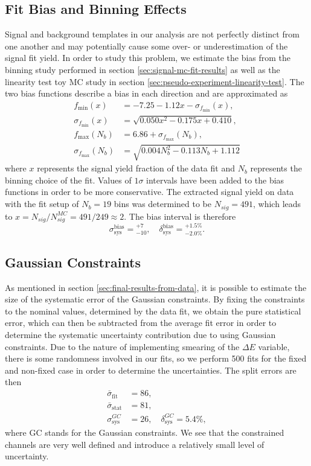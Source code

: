\subsection{Fit Bias and Binning Effects}
Signal and background templates in our analysis are not perfectly distinct from one another and may potentially cause some over- or underestimation of the signal fit yield. In order to study this problem, we estimate the bias from the binning study performed in section \ref{sec:signal-mc-fit-results} as well as the linearity test toy MC study in section \ref{sec:pseudo-experiment-linearity-test}. The two bias functions describe a bias in each direction and are approximated as
\begin{align}
f_{\mathrm{min}}(x) &= -7.25-1.12x - \sigma_{f_{\mathrm{min}}}(x), \\
\sigma_{f_{\mathrm{min}}}(x) &= \sqrt{0.050 x^2 - 0.175 x + 0.410}, \\
f_{\mathrm{max}}(N_b) &= 6.86 + \sigma_{f_{\mathrm{max}}}(N_b), \\
\sigma_{f_{\mathrm{max}}}(N_b) &= \sqrt{0.004N_b^2 - 0.113 N_b + 1.112}
\end{align}
where $x$ represents the signal yield fraction of the data fit and $N_b$ represents the binning choice of the fit. Values of $1\sigma$ intervals have been added to the bias functions in order to be more conservative. The extracted signal yield on data  with the fit setup of $N_b=19$ bins was determined to be $N_{sig} = 491$, which leads to $x = N_{sig} / N_{sig}^{MC} = 491 / 249 \approx 2$. The bias interval is therefore
\begin{equation}
\sigma_{\mathrm{sys}}^{\mathrm{bias}} = {}^{+7}_{-10},\quad \delta_{\mathrm{sys}}^{\mathrm{bias}} = {}^{+1.5\%}_{-2.0\%}.
\end{equation}

\subsection{Gaussian Constraints}
As mentioned in section \ref{sec:final-results-from-data}, it is possible to estimate the size of the systematic error of the Gaussian constraints. By fixing the constraints to the nominal values, determined by the data fit, we obtain the pure statistical error, which can then be subtracted from the average fit error in order to determine the systematic uncertainty contribution due to using Gaussian constraints. Due to the nature of implementing smearing of the $\Delta E$ variable, there is some randomness involved in our fits, so we perform 500 fits for the fixed and non-fixed case in order to determine the uncertainties. The split errors are then
\begin{align}
\bar \sigma_{\mathrm{fit}} &= 86, \\
\bar \sigma_{\mathrm{stat}} &= 81, \\
\sigma_{\mathrm{sys}}^{GC} &= 26,\quad \delta_{\mathrm{sys}}^{GC} = 5.4\%,
\end{align}
where GC stands for the Gaussian constraints. We see that the constrained channels are very well defined and introduce a relatively small level of uncertainty.


